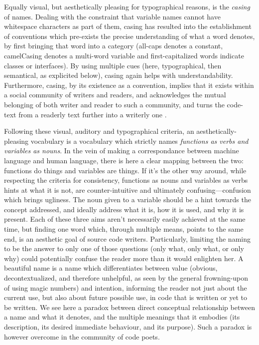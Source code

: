 Equally visual, but aesthetically pleasing for typographical reasons, is the \emph{casing} of names. Dealing with the constraint that variable names cannot have whitespace characters as part of them, casing has resulted into the establishment of conventions which pre-exists the precise understanding of what a word denotes, by first bringing that word into a category (all-caps denotes a constant, camelCasing denotes a multi-word variable and first-capitalized words indicate classes or interfaces). By using multiple cues (here, typographical, then semantical, as explicited below), casing again helps with understandability. Furthermore, casing, by its existence as a convention, implies that it exists within a social community of writers and readers, and acknowledges the mutual belonging of both writer and reader to such a community, and turns the code-text from a readerly text further into a writerly one \citep{barthes_bruissement_1984}.

Following these visual, auditory and typographical criteria, an aesthetically-pleasing vocabulary is a vocabulary which strictly names \emph{functions as verbs and variables as nouns}. In the vein of making a correspondance between machine language and human language, there is here a clear mapping between the two: functions do things and variables are things. If it's the other way around, while respecting the criteria for consistency, functions as nouns and variables as verbs hints at what it is not, are counter-intuitive and ultimately confusing—confusion which brings ugliness. The noun given to a variable should be a hint towards the concept addressed, and ideally address what it is, how it is used, and why it is present. Each of these three aims aren't necessarily easily achieved at the same time, but finding one word which, through multiple means, points to the same end, is an aesthetic goal of source code writers. Particularly, limiting the naming to be the answer to only one of those questions (only what, only what, or only why) could potentially confuse the reader more than it would enlighten her. A beautiful name is a name which differentiates between value (obvious, decontextualized, and therefore unhelpful, as seen by the general frowning-upon of using magic numbers) and intention, informing the reader not just about the current use, but also about future possible use, in code that is written or yet to be written. We see here a paradox between direct conceptual relationship between a name and what it denotes, and the multiple meanings that it embodies (its description, its desired immediate behaviour, and its purpose). Such a paradox is however overcome in the community of code poets.

